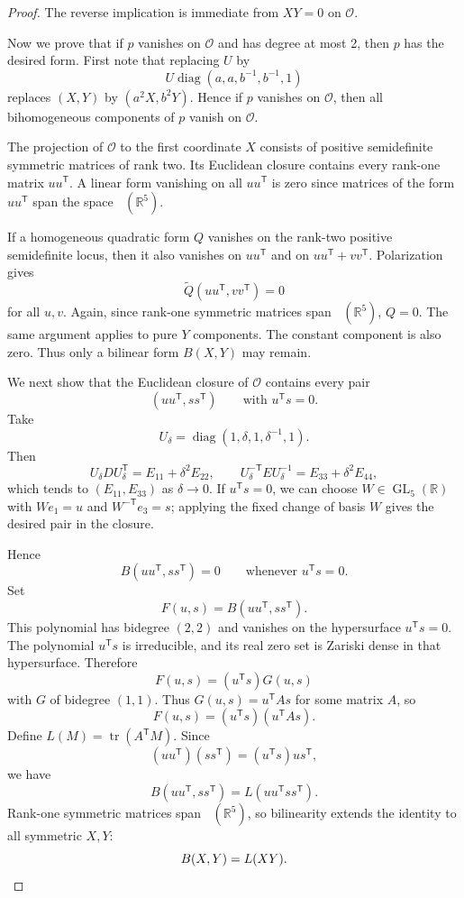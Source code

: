 \documentclass[11pt]{amsart}
\theoremstyle{remark}
\DeclareMathOperator{\Sym}{\mathsf{S}^2}
\DeclareMathOperator{\GL}{GL}
\DeclareMathOperator{\diag}{diag}
\DeclareMathOperator{\tr}{tr}
\newcommand{\tp}{{\scriptscriptstyle\mathsf{T}}}
\begin{document}
\begin{proof}
The reverse implication is immediate from $XY=0$ on $\mathcal O$.

Now we prove that if $p$ vanishes on $\mathcal O$ and has degree at most 2, then $p$ has the desired form. First note that replacing $U$ by
\[
U\diag(a,a,b^{-1},b^{-1},1)
\]
replaces $(X,Y)$ by $(a^2X,b^2Y)$. Hence if $p$ vanishes on $\mathcal O$, then all bihomogeneous components of $p$ vanish on $\mathcal O$.

The projection of $\mathcal O$ to the first coordinate $X$ consists of positive semidefinite symmetric matrices of rank two. Its Euclidean closure contains every rank-one matrix $uu^\tp $. A linear form vanishing on all $uu^\tp $ is zero since matrices of the form $uu^\tp $ span the space $\Sym(\mathbb{R}^5)$.

If a homogeneous quadratic form $Q$ vanishes on the rank-two positive semidefinite locus, then it also vanishes on $uu^\tp $ and on $uu^\tp +vv^\tp $. Polarization gives
\[
\widetilde Q(uu^\tp ,vv^\tp )=0
\]
for all $u,v$. Again, since rank-one symmetric matrices span $\Sym(\mathbb{R}^5)$, $Q=0$. The same argument applies to pure $Y$ components. The constant component is also zero. Thus only a bilinear form $B(X,Y)$ may remain.

We next show that the Euclidean closure of $\mathcal O$ contains every pair
\[
(uu^\tp ,ss^\tp )\qquad\text{with }u^\tp s=0.
\]
Take
\[
U_\delta=\diag(1,\delta,1,\delta^{-1},1).
\]
Then
\[
U_\delta DU_\delta^\tp =E_{11}+\delta^2E_{22},
\qquad
U_\delta^{-\tp} EU_\delta^{-1}=E_{33}+\delta^2E_{44},
\]
which tends to $(E_{11},E_{33})$ as $\delta \to 0$. If $u^\tp s=0$, we can choose $W\in\GL_5(\mathbb R)$ with $We_1=u$ and $W^{-\tp} e_3=s$; applying the fixed change of basis $W$ gives the desired pair in the closure.

Hence
\[
B(uu^\tp ,ss^\tp )=0\qquad\text{whenever }u^\tp s=0.
\]
Set
\[
F(u,s)=B(uu^\tp ,ss^\tp ).
\]
This polynomial has bidegree $(2,2)$ and vanishes on the hypersurface $u^\tp s=0$. The polynomial $u^\tp s$ is irreducible, and its real zero set is Zariski dense in that hypersurface. Therefore
\[
F(u,s)=(u^\tp s)G(u,s)
\]
with $G$ of bidegree $(1,1)$. Thus $G(u,s)=u^\tp As$ for some matrix $A$, so
\[
F(u,s)=(u^\tp s)(u^\tp As).
\]
Define $L(M)=\tr(A^\tp M)$. Since
\[
(uu^\tp )(ss^\tp )=(u^\tp s)us^\tp ,
\]
we have
\[
B(uu^\tp ,ss^\tp )=L(uu^\tp ss^\tp ).
\]
Rank-one symmetric matrices span $\Sym(\mathbb{R}^5)$, so bilinearity extends the identity to all symmetric $X,Y$:
\[
B(X,Y)=L(XY). \qedhere
\]
\end{proof}
\end{document}
